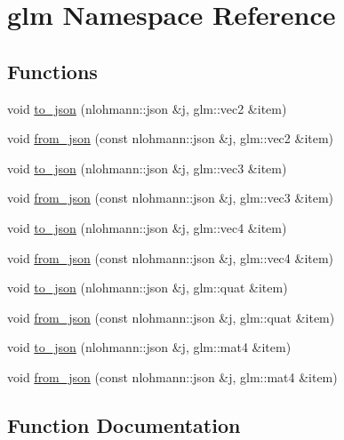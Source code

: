 \hypertarget{namespaceglm}{}\section{glm Namespace Reference}
\label{namespaceglm}
\subsection*{Functions}
\begin{DoxyCompactItemize}
\item 
void \mbox{\hyperlink{namespaceglm_a3adb64846afba05672c1976999369158}{to\+\_\+json}} (nlohmann\+::json \&j, glm\+::vec2 \&item)
\item 
void \mbox{\hyperlink{namespaceglm_aad40e96179d00def39e0a129bc8fc389}{from\+\_\+json}} (const nlohmann\+::json \&j, glm\+::vec2 \&item)
\item 
void \mbox{\hyperlink{namespaceglm_acd19f7adbfdaa852239fba87c641e49d}{to\+\_\+json}} (nlohmann\+::json \&j, glm\+::vec3 \&item)
\item 
void \mbox{\hyperlink{namespaceglm_acf0c993cd2af5d0ca0088ab3a8a2bc96}{from\+\_\+json}} (const nlohmann\+::json \&j, glm\+::vec3 \&item)
\item 
void \mbox{\hyperlink{namespaceglm_a2a60e38f026e0c50e09fe04b72470461}{to\+\_\+json}} (nlohmann\+::json \&j, glm\+::vec4 \&item)
\item 
void \mbox{\hyperlink{namespaceglm_a2ee25c36cde043f5aa75844f4948890f}{from\+\_\+json}} (const nlohmann\+::json \&j, glm\+::vec4 \&item)
\item 
void \mbox{\hyperlink{namespaceglm_a999a1ff9d6cd226d931984af1b7e8f6d}{to\+\_\+json}} (nlohmann\+::json \&j, glm\+::quat \&item)
\item 
void \mbox{\hyperlink{namespaceglm_ab6b43ce4c40859cdef9c5dae131ec7b7}{from\+\_\+json}} (const nlohmann\+::json \&j, glm\+::quat \&item)
\item 
void \mbox{\hyperlink{namespaceglm_adda541f3e45eb5de9100552ea6bf1f2f}{to\+\_\+json}} (nlohmann\+::json \&j, glm\+::mat4 \&item)
\item 
void \mbox{\hyperlink{namespaceglm_aa733090989e1f12ce6a41709b1f74846}{from\+\_\+json}} (const nlohmann\+::json \&j, glm\+::mat4 \&item)
\end{DoxyCompactItemize}


\subsection{Function Documentation}
\mbox{\label{namespaceglm_aad40e96179d00def39e0a129bc8fc389}} 
